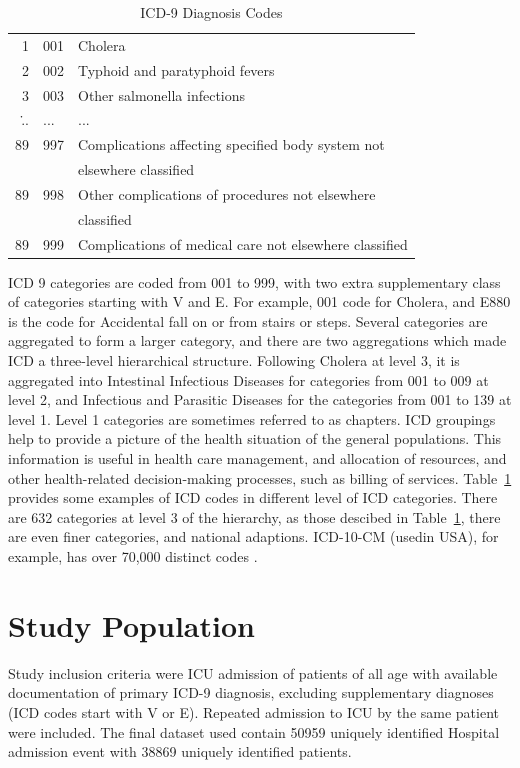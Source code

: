 \begin{table}[h!]
\begin{tabular}{|rll|}
		1 &001 &Cholera\\
		2 &002 &Typhoid and paratyphoid fevers\\
		3 &003 &Other salmonella infections\\
		\...&...&...\\
		89&997 &Complications affecting specified body system not \\
		&& elsewhere classified\\
		89&998 &Other complications of procedures not elsewhere \\
		&&classified\\
		89&999 &Complications of medical care not elsewhere classified\\
		
		\hline
		
	\end{tabular}
	\caption{ICD-9 Diagnosis Codes}
	\label{fig:icd10table}
\end{table}

\newpage

ICD 9 categories are coded from 001 to 999, with two extra supplementary class of categories starting with V and E. For example, 001 code for Cholera, and E880 is the code for Accidental fall on or from stairs or steps. Several categories are aggregated to form a larger category, and there are two aggregations which made ICD a three-level hierarchical structure. Following Cholera at level 3, it is aggregated into Intestinal Infectious Diseases for categories from 001 to 009 at level 2, and Infectious and Parasitic Diseases for the categories from 001 to 139 at level 1. Level 1 categories are sometimes referred to as chapters. ICD groupings help to provide a picture of the health situation of the general populations. This information is useful in health care management, and allocation of resources, and other health-related decision-making processes, such as billing of services. Table~\ref{fig:icd10table} provides some examples of ICD codes in different level of ICD categories. There are 632 categories at level 3 of the hierarchy, as those descibed in Table~\ref{fig:icd10table}, there are even finer categories, and national adaptions. ICD-10-CM (usedin USA), for example, has over 70,000 distinct codes \cite{ICD2019}. 

\section{Study Population }

Study inclusion criteria were ICU admission of patients of all age with available documentation of primary ICD-9 diagnosis, excluding supplementary diagnoses (ICD codes start with V or E). Repeated admission to ICU by the same patient were included. The final dataset used contain 50959 uniquely identified Hospital admission event with 38869 uniquely identified patients. 


